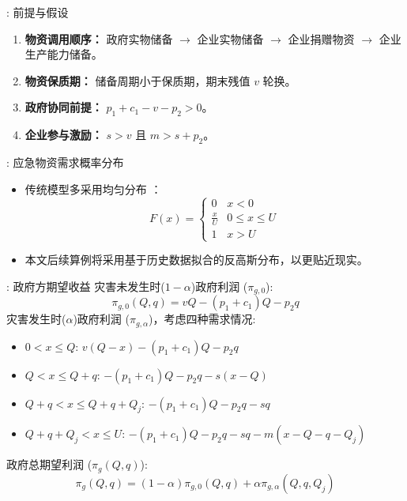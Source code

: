 \documentclass[9pt]{beamer}
\begin{document}
\begin{frame}{\insertsectionhead: 前提与假设}
    \begin{enumerate}
        \item \textbf{物资调用顺序：} 政府实物储备 $\rightarrow$ 企业实物储备 $\rightarrow$ 企业捐赠物资 $\rightarrow$ 企业生产能力储备。
        \item \textbf{物资保质期：} 储备周期小于保质期，期末残值 $v$ 轮换。
        \item \textbf{政府协同前提：} $p_1 + c_1 - v - p_2 > 0$。
        \item \textbf{企业参与激励：} $s > v$ 且 $m > s + p_2$。
    \end{enumerate}
\end{frame}

\begin{frame}{\insertsectionhead: 应急物资需求概率分布}
    \begin{itemize}
        \item 传统模型多采用均匀分布 \cite{chai2021考虑储备周期,chen2014突发事件灾前应急物资政企联合储备模式,hu2018考虑企业生产能力}：
            \begin{equation} \label{eq:beamer_uniform_cdf}
            F(x) = \begin{cases}
            0 & x < 0 \\
            \frac{x}{U} & 0 \leq x \leq U \\
            1 & x > U
            \end{cases}
            \end{equation}
        \item 本文后续算例将采用基于历史数据拟合的反高斯分布，以更贴近现实。
    \end{itemize}
\end{frame}

\begin{frame}{\insertsectionhead: 政府方期望收益}
    灾害未发生时($1-\alpha$)政府利润 ($\pi_{g,0}$):
    \begin{equation} \label{eq:beamer_profit_no_disaster_gov}
    \pi_{g,0}(Q,q) = v Q - (p_1 + c_1) Q - p_2 q
    \end{equation}
    灾害发生时($\alpha$)政府利润 ($\pi_{g,\alpha}$)，考虑四种需求情况:
    \begin{itemize}
        \item $0 < x \leq Q$: $v(Q-x) - (p_1+c_1)Q - p_2q$
        \item $Q < x \leq Q+q$: $-(p_1+c_1)Q - p_2q - s(x-Q)$
        \item $Q+q < x \leq Q+q+Q_j$: $-(p_1+c_1)Q - p_2q - sq$
        \item $Q+q+Q_j < x \leq U$: $-(p_1+c_1)Q - p_2q - sq - m(x-Q-q-Q_j)$
    \end{itemize}
    政府总期望利润 ($\pi_g(Q,q)$):
    \begin{equation} \label{eq:beamer_expected_profit_gov}
    \pi_g(Q,q) = (1-\alpha) \pi_{g,0}(Q,q) + \alpha \pi_{g,\alpha}(Q,q, Q_j)
    \end{equation}
    
\end{frame}
\end{document}
